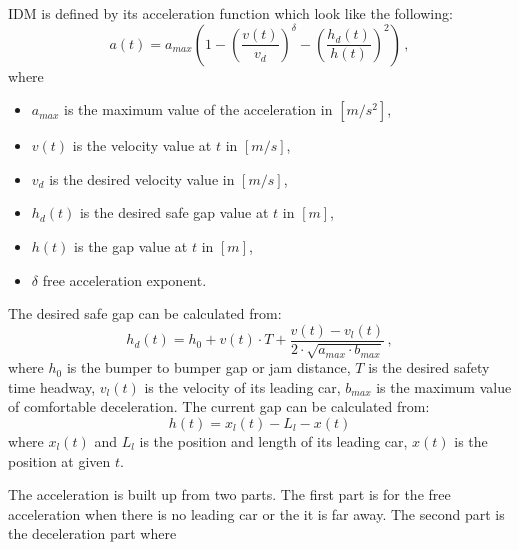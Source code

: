 \documentclass[a4paper,12pt,twoside]{report}
\begin{document}
			IDM is defined by its acceleration function which look like the following:
			\begin{equation}
				a(t)=a_{max}\left (  1 - \left ( \frac{v(t)}{v_d} \right )^\delta - \left ( \frac{h_d(t)}{h(t)} \right )^2 \right )\,,
			\end{equation}
			where
			\begin{itemize}
				\item $a_{max}$ is the maximum value of the acceleration in $[m/s^2]$,
				\item $v(t)$ is the velocity value at $t$ in $[m/s]$,
				\item $v_d$ is the desired velocity value in $[m/s]$,
				\item $h_d(t)$ is the desired safe gap value at $t$ in $[m]$,
				\item $h(t)$ is the gap value at $t$ in $[m]$,
				\item $\delta$ free acceleration exponent.
			\end{itemize}
			The desired safe gap can be calculated from:
			\begin{equation}
				h_d(t)=h_0 + v(t)\cdot T + \frac{v(t)-v_l(t)}{2\cdot \sqrt{a_{max}\cdot b_{max}}}\,,
			\end{equation}
			where $h_0$ is the bumper to bumper gap or jam distance, $T$ is the desired safety time headway, $v_l(t)$ is the velocity of its leading car, $b_{max}$ is the maximum value of comfortable deceleration.
			The current gap can be calculated from:
			\begin{equation}
				h(t)=x_l(t)-L_l - x(t)
			\end{equation}
			where $x_l(t)$ and $L_l$ is the position and length of its leading car, $x(t)$ is the position at given $t$.

			The acceleration is built up from two parts. The first part is for the free acceleration when there is no leading car or the it is far away. The second part is the deceleration part where 
\end{document}
